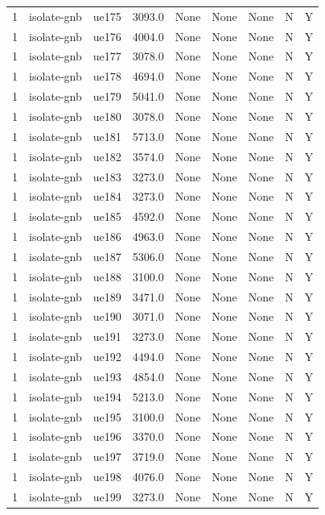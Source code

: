\begin{table}[ht]
\begin{tabular}{|c|c|c|c|c|c|c|c|c|}
1 & isolate-gnb & ue175 & 3093.0 & None & None & None & N & Y \\
1 & isolate-gnb & ue176 & 4004.0 & None & None & None & N & Y \\
1 & isolate-gnb & ue177 & 3078.0 & None & None & None & N & Y \\
1 & isolate-gnb & ue178 & 4694.0 & None & None & None & N & Y \\
1 & isolate-gnb & ue179 & 5041.0 & None & None & None & N & Y \\
1 & isolate-gnb & ue180 & 3078.0 & None & None & None & N & Y \\
1 & isolate-gnb & ue181 & 5713.0 & None & None & None & N & Y \\
1 & isolate-gnb & ue182 & 3574.0 & None & None & None & N & Y \\
1 & isolate-gnb & ue183 & 3273.0 & None & None & None & N & Y \\
1 & isolate-gnb & ue184 & 3273.0 & None & None & None & N & Y \\
1 & isolate-gnb & ue185 & 4592.0 & None & None & None & N & Y \\
1 & isolate-gnb & ue186 & 4963.0 & None & None & None & N & Y \\
1 & isolate-gnb & ue187 & 5306.0 & None & None & None & N & Y \\
1 & isolate-gnb & ue188 & 3100.0 & None & None & None & N & Y \\
1 & isolate-gnb & ue189 & 3471.0 & None & None & None & N & Y \\
1 & isolate-gnb & ue190 & 3071.0 & None & None & None & N & Y \\
1 & isolate-gnb & ue191 & 3273.0 & None & None & None & N & Y \\
1 & isolate-gnb & ue192 & 4494.0 & None & None & None & N & Y \\
1 & isolate-gnb & ue193 & 4854.0 & None & None & None & N & Y \\
1 & isolate-gnb & ue194 & 5213.0 & None & None & None & N & Y \\
1 & isolate-gnb & ue195 & 3100.0 & None & None & None & N & Y \\
1 & isolate-gnb & ue196 & 3370.0 & None & None & None & N & Y \\
1 & isolate-gnb & ue197 & 3719.0 & None & None & None & N & Y \\
1 & isolate-gnb & ue198 & 4076.0 & None & None & None & N & Y \\
1 & isolate-gnb & ue199 & 3273.0 & None & None & None & N & Y \\

\end{tabular}
\end{table}
